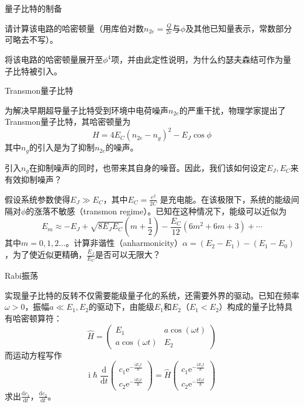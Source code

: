 \documentclass[answer]{cphos}
\begin{document}
\begin{problem}[50]{量子比特的制备}
\begin{problemstatement}
 请计算该电路的哈密顿量（用库伯对数$n_{2e}=\frac{Q}{2e}$与$\phi$及其他已知量表示，常数部分可略去不写）。

 将该电路的哈密顿量展开至$\phi^4$项，并由此定性说明，为什么约瑟夫森结可作为量子比特被引入。

Transmon量子比特

为解决早期超导量子比特受到环境中电荷噪声$n_{2e}$的严重干扰，物理学家提出了Transmon量子比特，其哈密顿量为
\begin{equation}
    H=4E_C\left(n_{2e}-n_g\right)^2-E_J\cos\phi
\end{equation}
其中$n_g$的引入是为了抑制$n_{2e}$的噪声。

引入$n_g$在抑制噪声的同时，也带来其自身的噪音。因此，我们该如何设定$E_J, E_C$来有效抑制噪声？

假设系统参数使得$E_J \gg E_C$，其中$E_C = \frac{e^2}{2C}$ 是充电能。在该极限下，系统的能级间隔对$\phi$的涨落不敏感（transmon regime）。已知在这种情况下，能级可以近似为
\begin{equation}
E_m\approx-E_J+\sqrt{8E_JE_C}\left(m+\frac{1}{2}\right)-\frac{E_C}{12}\left(6m^2+6m+3\right)+\cdots 
\end{equation}
其中$ m = 0,1,2\dots$。计算非谐性（anharmonicity）$\alpha=\left(E_2-E_1\right)-\left(E_1-E_0\right)$，为了使近似更精确，$\frac{E_J}{E_C}$是否可以无限大？

Rabi振荡

实现量子比特的反转不仅需要能级量子化的系统，还需要外界的驱动。已知在频率$\omega>0$，振幅$a\ll E_1, E_2$的驱动下，由能级$E_1$和$E_2$（$E_1<E_2$）构成的量子比特具有哈密顿算符：
\begin{equation}
	\hat{H}=\begin{pmatrix}
		E_1 & a\cos(\omega t) \\
		a\cos(\omega t) & E_2 
	\end{pmatrix}
\end{equation}
而运动方程写作
\begin{equation}
	\mathrm{i}\hslash\frac{\mathrm{d}}{\mathrm{d}t}\begin{pmatrix}c_1\mathrm{e}^{-\frac{\mathrm{i}E_1t}{\hslash}}\\c_2\mathrm{e}^{-\frac{\mathrm{i}E_2t}{\hslash}}\end{pmatrix}=\hat{H}\begin{pmatrix}c_1\mathrm{e}^{-\frac{\mathrm{i}E_1t}{\hslash}}\\c_2\mathrm{e}^{-\frac{\mathrm{i}E_2t}{\hslash}}\end{pmatrix}
\end{equation}
求出$\frac{\mathrm{d}c_1}{\mathrm{d}t}$，$\frac{\mathrm{d}c_2}{\mathrm{d}t}$。


\end{problemstatement}
\end{problem}
\end{document}
